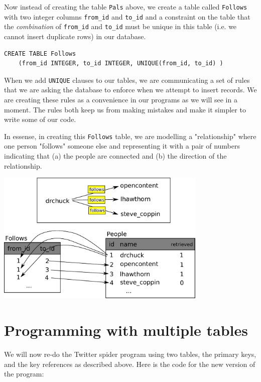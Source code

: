 \documentclass[10pt]{book}
\begin{document}
Now instead of creating the table {\tt Pals} above, we create
a table called {\tt Follows} with two integer columns
\verb"from_id" and \verb"to_id" and a constraint on the table that
the \emph{combination} of \verb"from_id" and \verb"to_id" must be unique 
in this table (i.e. we cannot insert duplicate rows) in our database.

\beforeverb
\begin{verbatim}
CREATE TABLE Follows 
    (from_id INTEGER, to_id INTEGER, UNIQUE(from_id, to_id) )
\end{verbatim}
\afterverb
%
When we add {\tt UNIQUE} clauses to our tables, we are communicating a set
of rules that we are asking the database to enforce when we attempt to insert
records.   We are creating these rules as a convenience in our programs as we
will see in a moment.  The rules both keep us from making mistakes and make
it simpler to write some of our code.

In essense, in creating this {\tt Follows} table, we are modelling a 
"relationship" where one person "follows" someone else
and representing it with a pair of numbers indicating that (a) the people are
connected and (b) the direction of the relationship.

\beforefig
\centerline{\includegraphics[height=2.50in]{figs2/twitter.eps}}
\afterfig


\section{Programming with multiple tables}

We will now re-do the Twitter spider program using two tables, the primary
keys, and the key references as described above.  Here is the code for 
the new version of the program:
\end{document}
